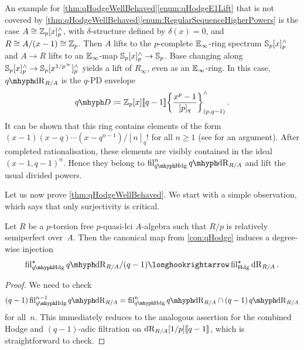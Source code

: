 \documentclass[DIV=12,numbers=enddot,leqno,bibliography=totoc]{scrartcl}
\begin{document}
	\begin{exm}
		An example for \cref{thm:qHodgeWellBehaved}\cref{enum:qHodgeE1Lift} that is not covered by \cref{thm:qHodgeWellBehaved}\cref{enum:RegularSequenceHigherPowers} is the case $A\cong \mathbb{Z}_p[x]_p^\wedge$, with $\delta$-structure defined by $\delta(x)=0$, and $R\cong A/(x-1)\cong \mathbb{Z}_p$. Then $A$ lifts to the $p$-complete $\mathbb{E}_\infty$-ring spectrum $\mathbb{S}_p[x]_p^\wedge$ and $A\rightarrow R$ lifts to an $\mathbb{E}_\infty$-map $\mathbb{S}_p[x]_p^\wedge\rightarrow \mathbb{S}_p$. Base changing along $\mathbb{S}_p[x]_p^\wedge\rightarrow \mathbb{S}_p[x^{1/p^\infty}]_p^\wedge$ yields a lift of $R_\infty$, even as an $\mathbb{E}_\infty$-ring. In this case, $\qdeRham_{R/A}$ is the $q$-PD envelope
		\begin{equation*}
			\q D\coloneqq \IZ_p[x]\qpower\left\{\frac{x^p-1}{[p]_q}\right\}_{(p,q-1)}^\complete\,.
		\end{equation*}
		It can be shown that this ring contains elements of the form $(x-1)(x-q)\dotsm (x-q^{n-1})/[n]_q!$ for all $n\geqslant 1$ (see \cite[Lemma~]{qdeRhamku} for an argument). After completed rationalisation, these elements are visibly contained in the ideal $(x-1,q-1)^n$. Hence they belong to $\fil_{\qHodge}^n \qdeRham_{R/A}$ and lift the usual divided powers.
	\end{exm}
	
	Let us now prove \cref{thm:qHodgeWellBehaved}. We start with a simple observation, which says that only surjectivity is critical.
	
	\begin{lem}\label{lem:qHodgeInjective}
		Let $R$ be a $p$-torsion free $p$-quasi-lci $A$-algebra such that $R/p$ is relatively semiperfect over~$A$. Then the canonical map from \cref{con:qHodge} induces a degree-wise injection
		\begin{equation*}
			\fil_{\qHodge}^\star\qdeRham_{R/A}/(q-1)\longhookrightarrow \fil_{\Hodge}^\star\deRham_{R/A}\,.
		\end{equation*}
	\end{lem}
	\begin{proof}
		We need to check 
		\begin{equation*}
			(q-1)\fil_{\qHodge}^{n-1}\qdeRham_{R/A}=\fil_{\qHodge}^n\qdeRham_{R/A}\cap (q-1)\qdeRham_{R/A}
		\end{equation*}
		for all~$n$. This immediately reduces to the analogous assertion for the combined Hodge and $(q-1)$-adic filtration on $\mathrm{dR}_{R/A}[1/p]\llbracket q-1\rrbracket$, which is straightforward to check.
	\end{proof}
	
\end{document}
